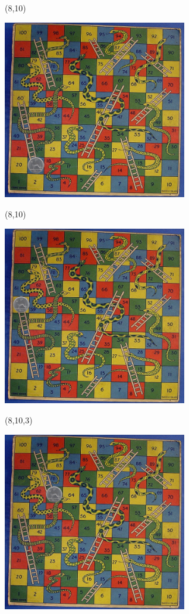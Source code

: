 \documentclass{beamer}
\begin{document}
\begin{frame}{(8,10)}
  \begin{center}
    \includegraphics[width=8cm]{game19.jpg}
  \end{center}
    \vfill
\tiny{}
\end{frame}


\begin{frame}{(8,10)}
  \begin{center}
    \includegraphics[width=8cm]{game60.jpg}
  \end{center}
    \vfill
\tiny{}
\end{frame}


\begin{frame}{(8,10,3)}
  \begin{center}
    \includegraphics[width=8cm]{game63.jpg}
  \end{center}
    \vfill
\tiny{}
\end{frame}
\end{document}
